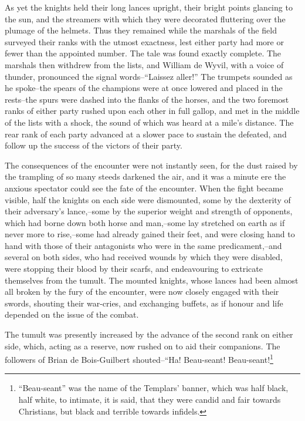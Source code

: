 As yet the knights held their long lances upright, their bright points
glancing to the sun, and the streamers with which they were decorated
fluttering over the plumage of the helmets. Thus they remained while the
marshals of the field surveyed their ranks with the utmost exactness,
lest either party had more or fewer than the appointed number. The tale
was found exactly complete. The marshals then withdrew from the lists,
and William de Wyvil, with a voice of thunder, pronounced the signal
words--``Laissez aller!'' The trumpets sounded as he spoke--the spears
of the champions were at once lowered and placed in the rests--the spurs
were dashed into the flanks of the horses, and the two foremost ranks of
either party rushed upon each other in full gallop, and met in the
middle of the lists with a shock, the sound of which was heard at a
mile's distance. The rear rank of each party advanced at a slower pace
to sustain the defeated, and follow up the success of the victors of
their party.

The consequences of the encounter were not instantly seen, for the dust
raised by the trampling of so many steeds darkened the air, and it was a
minute ere the anxious spectator could see the fate of the encounter.
When the fight became visible, half the knights on each side were
dismounted, some by the dexterity of their adversary's lance,--some by
the superior weight and strength of opponents, which had borne down both
horse and man,--some lay stretched on earth as if never more to
rise,--some had already gained their feet, and were closing hand to hand
with those of their antagonists who were in the same predicament,--and
several on both sides, who had received wounds by which they were
disabled, were stopping their blood by their scarfs, and endeavouring to
extricate themselves from the tumult. The mounted knights, whose lances
had been almost all broken by the fury of the encounter, were now
closely engaged with their swords, shouting their war-cries, and
exchanging buffets, as if honour and life depended on the issue of the
combat.

The tumult was presently increased by the advance of the second rank on
either side, which, acting as a reserve, now rushed on to aid their
companions. The followers of Brian de Bois-Guilbert shouted--``Ha!
Beau-seant! Beau-seant!\footnote{``Beau-seant'' was the name of the
Templars' banner,
which was half black, half white, to intimate, it is said, that they
were candid and fair towards Christians, but black and terrible towards
infidels.}

